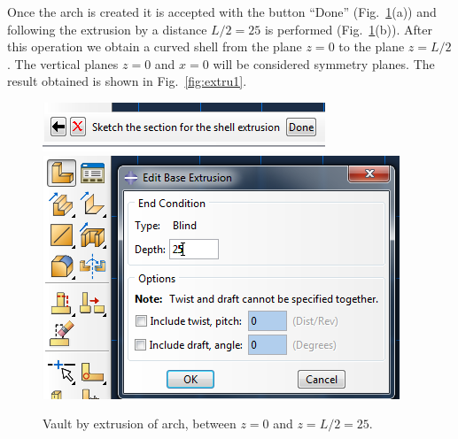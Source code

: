 \documentclass[english,a4paper,12pt]{article}
\begin{document}
Once the arch is created it is accepted with the button ``Done'' (Fig.~\ref{fig:extru}(a)) and following the extrusion by a distance $L/2=25$ is performed 
(Fig.~\ref{fig:extru}(b)).
After this operation we obtain a curved shell from the plane $z=0$ to the plane $z=L/2$.
The vertical planes $z=0$ and $x=0$ will be considered symmetry planes.
The result obtained is shown in 
Fig.~\ref{fig:extru1}.
\begin{figure}[h!tp]
\centering
{}%
{\includegraphics[scale=0.5]{capturas/05-part.png}}
{\includegraphics[scale=0.5]{capturas/06-part.png}}
\caption{Vault by extrusion of arch, between $z=0$ and $z=L/2=25$.}
\label{fig:extru}
\end{figure}
\end{document}
